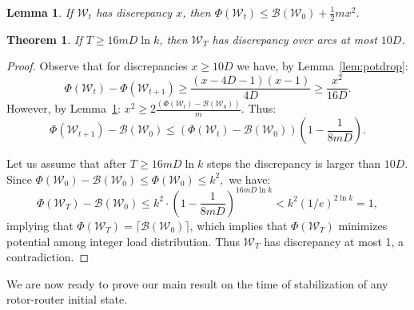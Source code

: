 \documentclass{article}[11pt,letter]
\newtheorem{lemma}[definition]{Lemma}
\newtheorem{theorem}[definition]{Theorem}
\newcommand{\wload}{\mathcal{W}}
\begin{document}
\begin{lemma}
\label{lem:atleastdiscrp}
If $\wload_t$ has discrepancy $x$, then
$\Phi(\wload_t) \le \mathcal{B}(\wload_0) + \frac12 m x^2$.

\end{lemma}

\begin{theorem}
\label{th:discrepancy}
If $T \ge 16mD \ln k$, then $\wload_T$ has discrepancy over arcs at most $10D$.
\end{theorem}
\begin{proof}
Observe that for discrepancies $x \ge 10D$ we have, by Lemma~\ref{lem:potdrop}:
$$\Phi(\wload_t) - \Phi(\wload_{t+1}) \ge \frac{(x-4D-1)(x-1)}{4D} \ge \frac{x^2}{16D}.$$
However, by Lemma~\ref{lem:atleastdiscrp}:
$x^2 \ge 2\frac{(\Phi(\wload_t)-\mathcal{B}(\wload_0))}{m}.$
Thus:
$$\Phi(\wload_{t+1})-\mathcal{B}(\wload_0) \le (\Phi(\wload_t)-\mathcal{B}(\wload_0))\left(1-\frac{1}{8mD}\right).$$

Let us assume that after $T \ge 16mD \ln k$ steps the discrepancy is larger than $10D$.
Since
$\Phi(\wload_0)-\mathcal{B}(\wload_0) \le \Phi(\wload_0) \le k^2,$
we have:
$$\Phi(\wload_T)-\mathcal{B}(\wload_0) \le k^2 \cdot \left(1-\frac{1}{8mD}\right)^{16mD\ln k} < k^2 (1/e)^{2 \ln k}  = 1,$$
implying that $\Phi(\wload_T)= \lceil \mathcal{B}(\wload_0) \rceil$, which implies that $\Phi(\wload_T)$ minimizes potential among integer load distribution. Thus $\wload_T$ has discrepancy at most 1, a contradiction.

\end{proof}

We are now ready to prove our main result on the time of stabilization of any rotor-router initial state.
\end{document}
